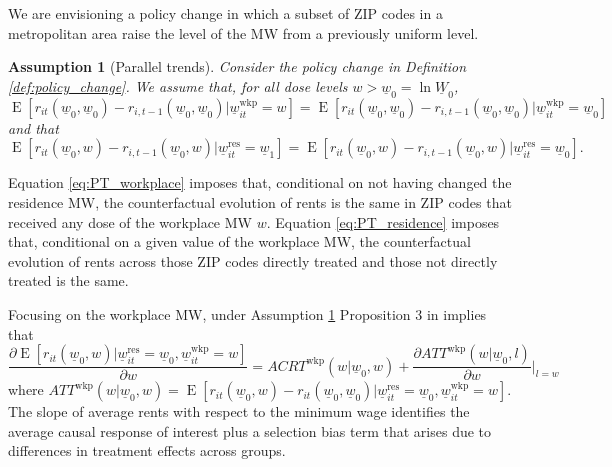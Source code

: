 \documentclass{article}
\newtheorem{assu}{Assumption}
\newcommand{\MW}{\underline{W}}
\newcommand{\mw}{\underline{w}}
\newcommand{\wkp}{\text{wkp}}
\newcommand{\res}{\text{res}}
\DeclareMathOperator{\E}{E}
\begin{document}
We are envisioning a policy change in which a subset of ZIP codes in a metropolitan 
area raise the level of the MW from a previously uniform level.

\begin{assu}[Parallel trends] \label{assu:PT}
    Consider the policy change in Definition \ref{def:policy_change}.
    We assume that, for all dose levels $w>\mw_0 = \ln \MW_0$,
    \begin{equation}\label{eq:PT_workplace}
        \E\left[r_{it}(\mw_0, \mw_0) - r_{i,t-1}(\mw_0, \mw_0) \big| \mw_{it}^{\wkp} = w \right] 
        = \E\left[r_{it}(\mw_0, \mw_0) - r_{i,t-1}(\mw_0, \mw_0) \big| \mw_{it}^{\wkp} = \mw_0 \right] 
    \end{equation}
    and that
    \begin{equation}\label{eq:PT_residence}
        \E\left[r_{it}(\mw_0, w) - r_{i,t-1}(\mw_0, w) \big| \mw_{it}^{\res} = \mw_1 \right] 
        = \E\left[r_{it}(\mw_0, w) - r_{i,t-1}(\mw_0, w) \big| \mw_{it}^{\res} = \mw_0 \right] .
    \end{equation}
\end{assu}

Equation \eqref{eq:PT_workplace} imposes that, conditional on not having changed
the residence MW, the counterfactual evolution of rents is the same in ZIP codes
that received any dose of the workplace MW $w$.
Equation \eqref{eq:PT_residence} imposes that, conditional on a given value of
the workplace MW, the counterfactual evolution of rents across those ZIP codes
directly treated and those not directly treated is the same.

Focusing on the workplace MW, under Assumption \ref{assu:PT}
Proposition 3 in \textcite{CallawayEtAl2021} implies that
$$
\frac{\partial \E\left[r_{it}(\mw_0, w) | \mw_{it}^{\res} = \mw_0, \mw_{it}^{\wkp} = w\right]}
     {\partial w} 
    = ACRT^{\wkp}(w | \mw_0, w) + \frac{\partial ATT^{\wkp}(w | \mw_0, l)}{\partial w} \Big|_{l = w}
$$
where $ATT^{\wkp}(w | \mw_0, w) = \E\left[r_{it}(\mw_0, w) - r_{it}(\mw_0, \mw_0) \big| \mw_{it}^{\res} = \mw_0, \mw_{it}^{\wkp} = w\right]$.
The slope of average rents with respect to the minimum wage identifies
the average causal response of interest plus a selection bias term that arises
due to differences in treatment effects across groups.
\end{document}
